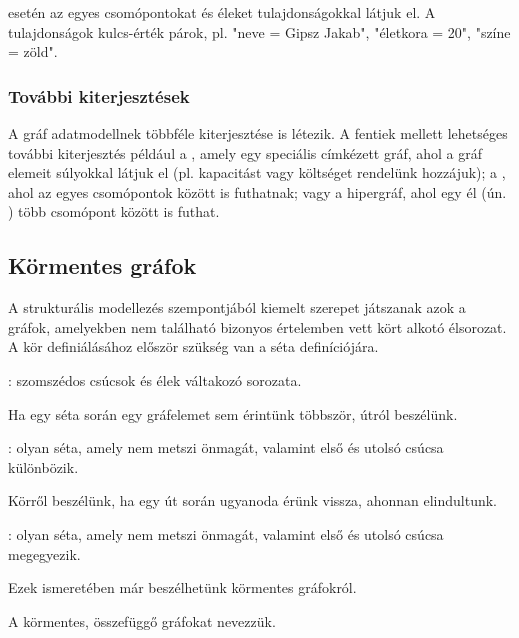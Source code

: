  esetén az egyes csomópontokat és éleket tulajdonságokkal látjuk el. A tulajdonságok kulcs-érték párok, pl. "neve = Gipsz Jakab", "életkora = 20", "színe = zöld".

\subsubsection{További kiterjesztések}

A gráf adatmodellnek többféle kiterjesztése is létezik. A fentiek mellett lehetséges további kiterjesztés például a , amely egy speciális címkézett gráf, ahol a gráf elemeit súlyokkal látjuk el (pl. kapacitást vagy költséget rendelünk hozzájuk); a , ahol az egyes csomópontok között  is futhatnak; vagy a hipergráf, ahol egy él (ún. ) több csomópont között is futhat.


\subsection{Körmentes gráfok}

A strukturális modellezés szempontjából kiemelt szerepet játszanak azok a gráfok, amelyekben nem található bizonyos értelemben vett kört alkotó élsorozat. A kör definiálásához először szükség van a séta definíciójára.

\begin{definicio}
	: szomszédos csúcsok és élek váltakozó sorozata.
\end{definicio}

Ha egy séta során egy gráfelemet sem érintünk többször, útról beszélünk.

\begin{definicio}
: olyan séta, amely nem metszi önmagát, valamint első és utolsó csúcsa különbözik.
\end{definicio}

Körről beszélünk, ha egy út során ugyanoda érünk vissza, ahonnan elindultunk.

\begin{definicio}
: olyan séta, amely nem metszi önmagát, valamint első és utolsó csúcsa megegyezik.
\end{definicio}

Ezek ismeretében már beszélhetünk körmentes gráfokról.

\begin{definicio}
	A körmentes, összefüggő gráfokat  nevezzük.
\end{definicio}

